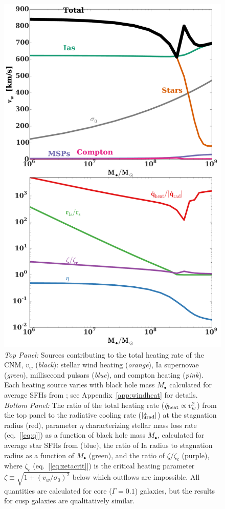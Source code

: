 \documentclass[usenatbib,fleqn]{mn2e}
\newcommand{\Mbh}[1][]{M_{\bullet#1}}
\newcommand{\vwO}{v_{w}}
\begin{document}
\begin{figure}
\includegraphics[width=\columnwidth]{vwSources.pdf}
\caption{\label{fig:vwSources} {\it Top Panel:} Sources contributing
  to the total heating rate of the CNM, $\vwO$ ({\it black}): stellar
  wind heating ({\it orange}), Ia supernovae ({\it green}),
  millisecond pulsars ({\it blue}), and compton heating ({\it pink}).
  Each heating source varies with black hole mass $\Mbh$ calculated
  for average SFHs from \citet{MosterNaab+:2013a}; see
  Appendix~\ref{app:windheat} for details.  {\it Bottom Panel:} The
  ratio of the total heating rate ($\dot{q}_{\rm heat} \propto
  v_{w}^{2}$) from the top panel to the radiative cooling rate
  ($|\dot{q}_{\rm rad}|$) at the stagnation radius (red), parameter
  $\eta$ characterizing stellar mass loss rate (eq.~[\ref{eq:q}]) as a
  function of black hole mass $\Mbh$, calculated for average star SFHs
  from \citealt{MosterNaab+:2013a} (blue), the ratio of Ia radius to
  stagnation radius as a function of $\Mbh$ (green), and the ratio of
  $\zeta/\zeta_{c}$ (purple), where $\zeta_c$
  (eq.~[\ref{eq:zetacrit}]) is the critical heating parameter $\zeta
  \equiv \sqrt{1+(v_w/\sigma_0)^2}$ below which outflows are
  impossible.  All quantities are calculated for core
  ($\Gamma=0.1$) galaxies, but the results for cusp galaxies are
  qualitatively similar.}
\end{figure}
\end{document}
